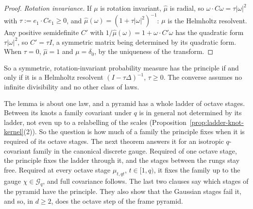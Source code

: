 \begin{proof}
\emph{Rotation invariance.} If $\mu$ is rotation invariant, $\widehat\mu$ is radial, so
$\omega\cdot C\omega = \tau|\omega|^2$ with $\tau := e_1\cdot Ce_1 \ge 0$, and
$\widehat\mu(\omega) = (1 + \tau|\omega|^2)^{-1}$: $\mu$ is the Helmholtz resolvent. Any positive
semidefinite $C'$ with $1/\widehat\mu(\omega) = 1 + \omega\cdot C'\omega$ has the quadratic form
$\tau|\omega|^2$, so $C' = \tau I$, a symmetric matrix being determined by its quadratic form. When
$\tau = 0$, $\widehat\mu = 1$ and $\mu = \delta_0$, by the uniqueness of the transform.
\end{proof}

So a symmetric, rotation-invariant probability measure has the principle if and only if it is a
Helmholtz resolvent $(I - \tau\Delta)^{-1}$, $\tau \ge 0$. The converse assumes no infinite
divisibility and no other class of laws.

The lemma is about one law, and a pyramid has a whole ladder of octave stages. Between its knots a
family covariant under $q$ is in general not determined by its ladder, not even up to a relabelling
of the scales (Proposition~\ref{prop:ladder-knot-kernel}(2)). So the question is how much of a
family the principle fixes when it is required of its octave stages. The next theorem answers it
for an isotropic $q$-covariant family in the canonical discrete gauge. Required of one octave stage,
the principle fixes the ladder through it, and the stages between the rungs stay free. Required at
every octave stage $\mu_{t,qt}$, $t \in [1, q)$, it fixes the family up to the gauge
$\chi \in \mathcal{G}_q$, and full covariance follows. The last two clauses say which stages of the
\Matern{} pyramid have the principle. They also show that the Gaussian stages fail it, and so, in
$d \ge 2$, does the octave step of the frame \Matern{} pyramid.

